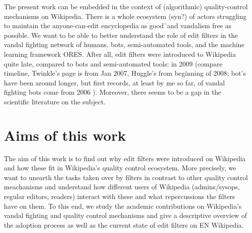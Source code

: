The present work can be embedded in the context of (algorithmic) quality-control mechanisms on Wikipedia.
There is a whole ecosystem (syn?) of actors struggling to maintain the anyone-can-edit encyclopedia as good^^ and vandalism free as possible.
We want to be able to better understand the role of edit filters in the vandal fighting network of humans, bots, semi-automated tools, and the machine learning framework ORES.
After all, edit filters were introduced to Wikipedia quite late, compared to bots and semi-automated tools: in 2009 (compare timeline, Twinkle's page is from Jan 2007, Huggle's from beginning of 2008; bot's have been around longer, but first records, at least by me so far, of vandal fighting bots come from 2006 ). %
Moreover, there seems to be a gap in the scientific literature on the subject.

\section{Aims of this work}

The aim of this work is to find out why edit filters were introduced on Wikipedia and how these fit in Wikipedia's quality control ecosystem.
More precisely, we want to unearth the tasks taken over by filters in contrast to other quality control meachanisms
and understand how different users of Wikipedia (admins/sysops, regular editors, readers) interact with these and what repercussions the filters have on them.
To this end, we study the academic contributions on Wikipedia's vandal fighting and quality control mechanisms and give a descriptive overview of the adoption process as well as the current state of edit filters on EN Wikipedia.


\begin{comment}
\begin{itemize}
	\item Was sind die mit dieser Arbeit verfolgten Ziele? Welches Problem soll gelöst werden?
	\item Eine Beschreibung der ersten Ideen, der vorgeschlagene Ansatz und die aktuell erreichten Resultate
	\item Eine Beschreibung, welchen Beitrag die Arbeit leistet, um das vorgestellte Problem zu lösen
	\item Eine Diskussion, wie die vorgeschlagene Lösung sich von bestehenden unterscheidet, was ist neu oder besser?
\end{itemize}

* Think about: what's the computer science take on the field? How can we design a "better"/more efficient/more user friendly system? A system that reflects particular values (vgl Code 2.0, Chapter 3, p.34)?
  * GT is good for tackling controversial questions: e.g. are filters with disallow action a too severe interference with the editing process that has way too much negative consequences? (e.g. driving away new comers?)
\end{comment}

